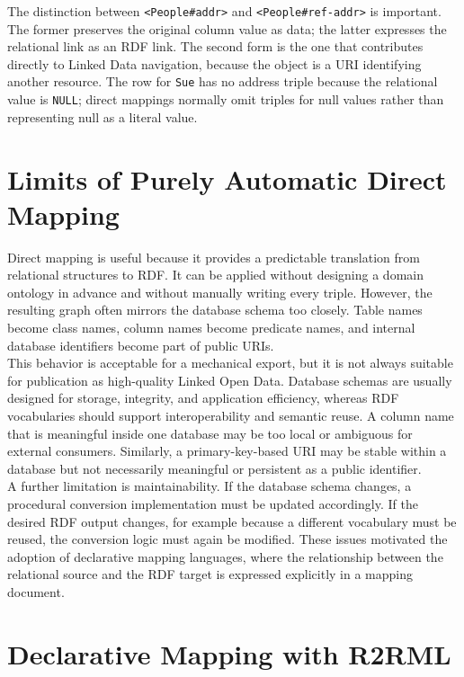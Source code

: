 \documentclass{scrbook}
\begin{document}
	The distinction between \texttt{<People\#addr>} and \texttt{<People\#ref-addr>} is important. The former preserves the original column value as data; the latter expresses the relational link as an RDF link. The second form is the one that contributes directly to Linked Data navigation, because the object is a URI identifying another resource. The row for \texttt{Sue} has no address triple because the relational value is \texttt{NULL}; direct mappings normally omit triples for null values rather than representing null as a literal value.
	
	\section{Limits of Purely Automatic Direct Mapping}
	
	Direct mapping is useful because it provides a predictable translation from relational structures to RDF. It can be applied without designing a domain ontology in advance and without manually writing every triple. However, the resulting graph often mirrors the database schema too closely. Table names become class names, column names become predicate names, and internal database identifiers become part of public URIs.\\
	
	This behavior is acceptable for a mechanical export, but it is not always suitable for publication as high-quality Linked Open Data. Database schemas are usually designed for storage, integrity, and application efficiency, whereas RDF vocabularies should support interoperability and semantic reuse. A column name that is meaningful inside one database may be too local or ambiguous for external consumers. Similarly, a primary-key-based URI may be stable within a database but not necessarily meaningful or persistent as a public identifier.\\
	
	A further limitation is maintainability. If the database schema changes, a procedural conversion implementation must be updated accordingly. If the desired RDF output changes, for example because a different vocabulary must be reused, the conversion logic must again be modified. These issues motivated the adoption of declarative mapping languages, where the relationship between the relational source and the RDF target is expressed explicitly in a mapping document.
	
	\section{Declarative Mapping with R2RML}
	
\end{document}
